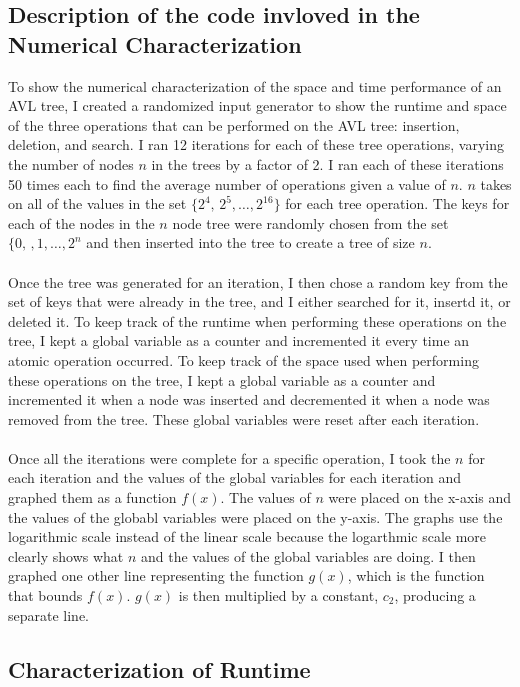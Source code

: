 \documentclass[12pt]{article}
\begin{document}
\subsection*{Description of the code invloved in the Numerical Characterization}
To show the numerical characterization of the space and time performance of an
AVL tree, I created a randomized input generator to show the runtime and space
of the three operations that can be performed on the AVL tree: insertion,
deletion, and search.  I ran 12 iterations for each of these tree operations,
varying the number of nodes $n$ in the trees by a factor of 2.  I ran each of
these iterations 50 times each to find the average number of operations given a
value of $n$.  $n$ takes on all of the values in the set
$\{2^4,\,2^5,\ldots,2^{16}\}$ for each tree operation.
The keys for each of the nodes in the $n$ node tree were randomly chosen from 
the set $\{0,\,,1,\ldots,2^n$ and then inserted into the tree to create a tree of size $n$.\\
\\
Once the tree was generated for an iteration, I then chose a random key
from the set of keys that were already in the tree, and I either searched for
it, insertd it, or deleted it.  To keep track of the runtime when performing
these operations on the tree, I kept a global variable as a counter and
incremented it every time an atomic operation occurred.  To keep track of the space used when
performing these operations on the tree, I kept a global variable as a counter
and incremented it when a node was inserted and decremented it when a node was
removed from the tree.  These global variables were reset after each
iteration.\\
\\
Once all the iterations were complete for a specific operation, I took the $n$
for each iteration and the values of the global variables for each iteration and
graphed them as a function $f(x)$.  The values of $n$ were placed on the
x-axis and the values of the globabl variables were placed on the y-axis.  The graphs use the logarithmic
scale instead of the linear scale because the logarthmic scale more clearly
shows what $n$ and the values of the global variables are doing.
I then graphed one other line representing the function $g(x)$, which is
the function that bounds $f(x)$. $g(x)$ is then
multiplied by a constant, $c_2$, producing a separate line.
\subsection*{Characterization of Runtime}
\end{document}

